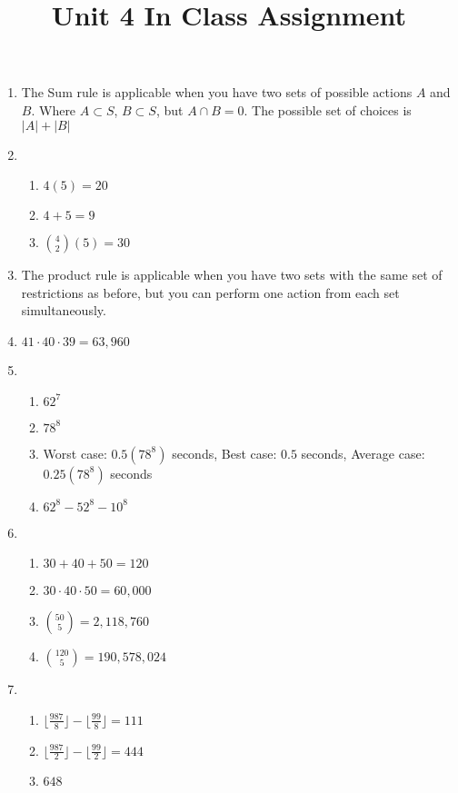 \documentclass{article}
\title{Unit 4 In Class Assignment}
\begin{document}
\maketitle
\pagebreak

\begin{enumerate}
    \item The Sum rule is applicable when you have two sets of possible actions $A$ and $B$. Where $A \subset S$, $B \subset S$, but $A \cap B = 0$. The possible set of choices is $|A| + |B|$
    \item \begin{enumerate}
        \item $4(5) = 20$
	    \item $4 + 5 = 9$ 
	    \item $\binom{4}{2}(5) = 30$
    \end{enumerate}
    \item The product rule is applicable when you have two sets with the same set of restrictions as before, but you can perform one action from each set simultaneously.
    \item $41\cdot 40\cdot 39 = 63{,}960$
    \item \begin{enumerate}
        \item $62^{7}$
        \item $78^{8}$
        \item Worst case: $0.5(78^{8})$ seconds, Best case: $0.5$ seconds, Average case: $0.25(78^{8})$ seconds
        \item $62^{8} - 52^{8} - 10^{8}$
    \end{enumerate}
    \item \begin{enumerate}
        \item $30+40+50 = 120$
        \item $30 \cdot 40 \cdot 50 = 60{,}000$
        \item $\binom{50}{5} = 2{,}118{,}760$
        \item $\binom{120}{5} = 190{,}578{,}024$
    \end{enumerate}
    \item \begin{enumerate}
        \item $\lfloor \tfrac{987}{8} \rfloor - \lfloor \tfrac{99}{8} \rfloor = 111$
        \item $\lfloor \tfrac{987}{2} \rfloor - \lfloor \tfrac{99}{2} \rfloor = 444$
        \item $648$

\end{enumerate}
\end{enumerate}
\end{document}
